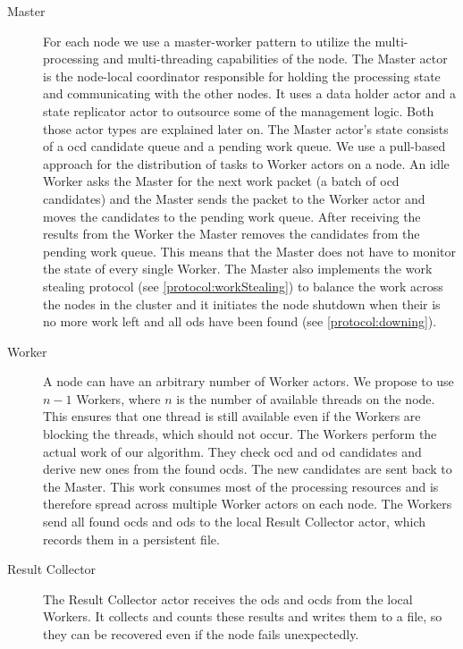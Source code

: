   \begin{description}
  \item[Master]
    For each node we use a master-worker pattern to utilize the multi-processing and multi-threading capabilities of the node.
    The Master actor is the node-local coordinator responsible for holding the processing state and communicating with the other nodes.
    It uses a data holder actor and a state replicator actor to outsource some of the management logic.
    Both those actor types are explained later on.
    The Master actor's state consists of a \gls{ocd} candidate queue and a pending work queue.
    We use a pull-based approach for the distribution of tasks to Worker actors on a node.
    An idle Worker asks the Master for the next work packet (a batch of \gls{ocd} candidates) and the Master sends the packet to the Worker actor and moves the candidates to the pending work queue.
    After receiving the results from the Worker the Master removes the candidates from the pending work queue.
    This means that the Master does not have to monitor the state of every single Worker.
    The Master also implements the work stealing protocol (see \cref{protocol:workStealing}) to balance the work across the nodes in the cluster and it initiates the node shutdown when their is no more work left and all \glspl{od} have been found (see \cref{protocol:downing}).

  \item[Worker]
    A node can have an arbitrary number of Worker actors.
    We propose to use $n - 1$ Workers, where $n$ is the number of available threads on the node.
    This ensures that one thread is still available even if the Workers are blocking the threads, which should not occur.
    The Workers perform the actual work of our algorithm.
    They check \gls{ocd} and \gls{od} candidates and derive new ones from the found \glspl{ocd}.
    The new candidates are sent back to the Master.
    This work consumes most of the processing resources and is therefore spread across multiple Worker actors on each node.
    The Workers send all found \glspl{ocd} and \glspl{od} to the local Result Collector actor, which records them in a persistent file.

  \item[Result Collector]
    The Result Collector actor receives the \glspl{od} and \glspl{ocd} from the local Workers.
    It collects and counts these results and writes them to a file, so they can be recovered even if the node fails unexpectedly.


\end{description}
